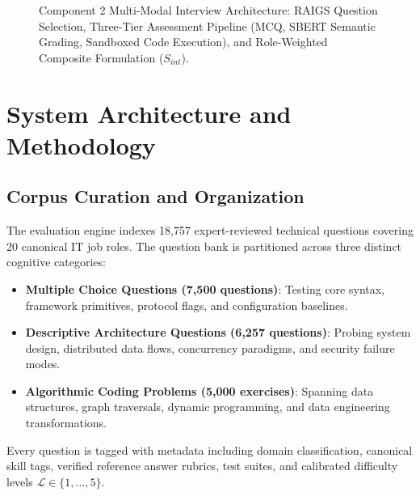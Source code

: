 \documentclass[conference]{IEEEtran}
\begin{document}
\begin{figure}[t]
\caption{Component 2 Multi-Modal Interview Architecture: RAIGS Question Selection, Three-Tier Assessment Pipeline (MCQ, SBERT Semantic Grading, Sandboxed Code Execution), and Role-Weighted Composite Formulation ($S_{int}$).}
\label{fig:c2_pipeline}
\end{figure}

\section{System Architecture and Methodology}

\subsection{Corpus Curation and Organization}
The evaluation engine indexes 18,757 expert-reviewed technical questions covering 20 canonical IT job roles. The question bank is partitioned across three distinct cognitive categories:
\begin{itemize}
    \item \textbf{Multiple Choice Questions (7,500 questions)}: Testing core syntax, framework primitives, protocol flags, and configuration baselines.
    \item \textbf{Descriptive Architecture Questions (6,257 questions)}: Probing system design, distributed data flows, concurrency paradigms, and security failure modes.
    \item \textbf{Algorithmic Coding Problems (5,000 exercises)}: Spanning data structures, graph traversals, dynamic programming, and data engineering transformations.
\end{itemize}
Every question is tagged with metadata including domain classification, canonical skill tags, verified reference answer rubrics, test suites, and calibrated difficulty levels $\mathcal{L} \in \{1, \dots, 5\}$.
\end{document}
